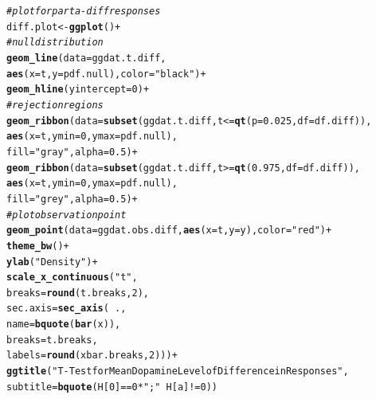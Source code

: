 \documentclass{article}\usepackage[]{graphicx}\usepackage[]{xcolor}
\makeatletter
\newcommand{\hlnum}[1]{\textcolor[rgb]{0.686,0.059,0.569}{#1}}%
\newcommand{\hlsng}[1]{\textcolor[rgb]{0.192,0.494,0.8}{#1}}%
\newcommand{\hlcom}[1]{\textcolor[rgb]{0.678,0.584,0.686}{\textit{#1}}}%
\newcommand{\hlopt}[1]{\textcolor[rgb]{0,0,0}{#1}}%
\newcommand{\hldef}[1]{\textcolor[rgb]{0.345,0.345,0.345}{#1}}%
\newcommand{\hlkwb}[1]{\textcolor[rgb]{0.69,0.353,0.396}{#1}}%
\newcommand{\hlkwc}[1]{\textcolor[rgb]{0.333,0.667,0.333}{#1}}%
\newcommand{\hlkwd}[1]{\textcolor[rgb]{0.737,0.353,0.396}{\textbf{#1}}}%
\newenvironment{kframe}{%
 \def\at@end@of@kframe{}%
 \ifinner\ifhmode%
  \def\at@end@of@kframe{\end{minipage}}%
  \begin{minipage}{\columnwidth}%
 \fi\fi%
 \def\FrameCommand##1{\hskip\@totalleftmargin \hskip-\fboxsep
 \colorbox{shadecolor}{##1}\hskip-\fboxsep
     \hskip-\linewidth \hskip-\@totalleftmargin \hskip\columnwidth}%
 \MakeFramed {\advance\hsize-\width
   \@totalleftmargin\z@ \linewidth\hsize
   \@setminipage}}%
 {\par\unskip\endMakeFramed%
 \at@end@of@kframe}
\newenvironment{knitrout}{}{} %
\makeatother
\begin{document}
\begin{enumerate}
\begin{enumerate}
\begin{knitrout}
\begin{kframe}
\begin{alltt}
\hlcom{#plot for part a - diff responses}
\hldef{diff.plot} \hlkwb{<-} \hlkwd{ggplot}\hldef{()} \hlopt{+}
\hlcom{# null distribution}
\hlkwd{geom_line}\hldef{(}\hlkwc{data}\hldef{=ggdat.t.diff,}
          \hlkwd{aes}\hldef{(}\hlkwc{x}\hldef{=t,} \hlkwc{y}\hldef{=pdf.null),} \hlkwc{color} \hldef{=} \hlsng{"black"}\hldef{)}\hlopt{+}
\hlkwd{geom_hline}\hldef{(}\hlkwc{yintercept}\hldef{=}\hlnum{0}\hldef{)}\hlopt{+}
\hlcom{# rejection regions}
\hlkwd{geom_ribbon}\hldef{(}\hlkwc{data}\hldef{=}\hlkwd{subset}\hldef{(ggdat.t.diff, t}\hlopt{<=}\hlkwd{qt}\hldef{(}\hlkwc{p} \hldef{=} \hlnum{0.025}\hldef{,} \hlkwc{df}\hldef{=df.diff)),}
            \hlkwd{aes}\hldef{(}\hlkwc{x}\hldef{=t,} \hlkwc{ymin}\hldef{=}\hlnum{0}\hldef{,} \hlkwc{ymax}\hldef{=pdf.null),}
            \hlkwc{fill}\hldef{=}\hlsng{"gray"}\hldef{,} \hlkwc{alpha}\hldef{=}\hlnum{0.5}\hldef{)}\hlopt{+}
\hlkwd{geom_ribbon}\hldef{(}\hlkwc{data}\hldef{=}\hlkwd{subset}\hldef{(ggdat.t.diff, t}\hlopt{>=}\hlkwd{qt}\hldef{(}\hlnum{0.975}\hldef{,} \hlkwc{df}\hldef{=df.diff)),}
            \hlkwd{aes}\hldef{(}\hlkwc{x}\hldef{=t,} \hlkwc{ymin}\hldef{=}\hlnum{0}\hldef{,} \hlkwc{ymax}\hldef{=pdf.null),}
            \hlkwc{fill}\hldef{=}\hlsng{"grey"}\hldef{,} \hlkwc{alpha}\hldef{=}\hlnum{0.5}\hldef{)}\hlopt{+}
\hlcom{# plot observation point}
\hlkwd{geom_point}\hldef{(}\hlkwc{data}\hldef{=ggdat.obs.diff,} \hlkwd{aes}\hldef{(}\hlkwc{x}\hldef{=t,} \hlkwc{y}\hldef{=y),} \hlkwc{color}\hldef{=}\hlsng{"red"}\hldef{)}\hlopt{+}
\hlkwd{theme_bw}\hldef{()}\hlopt{+}
\hlkwd{ylab}\hldef{(}\hlsng{"Density"}\hldef{)}\hlopt{+}
\hlkwd{scale_x_continuous}\hldef{(}\hlsng{"t"}\hldef{,}
                   \hlkwc{breaks} \hldef{=} \hlkwd{round}\hldef{(t.breaks,}\hlnum{2}\hldef{),}
                   \hlkwc{sec.axis} \hldef{=} \hlkwd{sec_axis}\hldef{(}\hlopt{~}\hldef{.,}
                                       \hlkwc{name} \hldef{=} \hlkwd{bquote}\hldef{(}\hlkwd{bar}\hldef{(x)),}
                                       \hlkwc{breaks} \hldef{= t.breaks,}
                                       \hlkwc{labels} \hldef{=} \hlkwd{round}\hldef{(xbar.breaks,}\hlnum{2}\hldef{)))}\hlopt{+}
\hlkwd{ggtitle}\hldef{(}\hlsng{"T-Test for Mean Dopamine Level of Difference in Responses"}\hldef{,}
        \hlkwc{subtitle}\hldef{=}\hlkwd{bquote}\hldef{(H[}\hlnum{0}\hldef{]}\hlopt{==}\hlnum{0}\hlopt{*}\hlsng{";"}\hlopt{~}\hldef{H[a]} \hlopt{!=} \hlnum{0}\hldef{))}
\end{alltt}
\end{kframe}
\end{knitrout}
\begin{figure}[H]

\end{figure}
\end{enumerate}
\end{enumerate}
\end{document}
